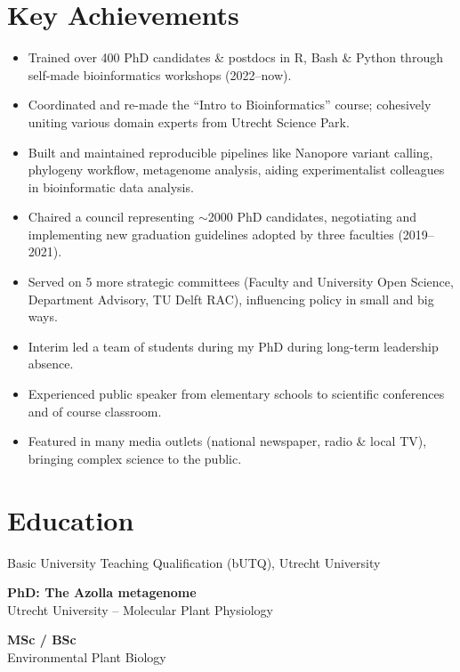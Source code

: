 \documentclass[a4paper,10pt]{article}
\begin{document}
{\begin{adjustbox}{valign=t}
\begin{minipage}[t]{0.6\textwidth}
\section*{Key Achievements}
\begin{itemize}
  \item Trained over 400 PhD candidates \& postdocs in R, Bash \& Python through self-made bioinformatics workshops (2022--now).
  \item Coordinated and re-made the “Intro to Bioinformatics” course; cohesively uniting various domain experts from Utrecht Science Park.
  \item Built and maintained reproducible pipelines like Nanopore variant calling, phylogeny workflow, metagenome analysis, aiding experimentalist colleagues in bioinformatic data analysis.
  \item Chaired a council representing $\sim$2000 PhD candidates, negotiating and implementing new graduation guidelines adopted by three faculties (2019--2021).
  \item Served on 5 more strategic committees (Faculty and University Open Science, Department Advisory, TU Delft RAC), influencing policy in small and big ways.
  \item Interim led a team of students during my PhD during long-term leadership absence.
  \item Experienced public speaker from elementary schools to scientific conferences and of course classroom.
  \item Featured in many media outlets (national newspaper, radio \& local TV), bringing complex science to the public.
\end{itemize}


\end{minipage}%
\end{adjustbox}%
}
\newpage

\section*{Education}
\begin{description}
\raggedright
\item[\normalfont \textcolor{ForestGreen}{\textbf{2022.}}] Basic University Teaching Qualification (bUTQ), Utrecht University
\item[\normalfont \textcolor{ForestGreen}{\textbf{2017 -- 2022.}}] \textbf{PhD: The Azolla metagenome} \\
Utrecht University – Molecular Plant Physiology
\item[\normalfont \textcolor{ForestGreen}{\textbf{2010 -- 2017.}}] \textbf{MSc / BSc}\\
Environmental Plant Biology
\end{description}
\end{document}
